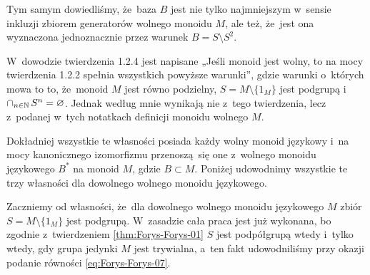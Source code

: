 \documentclass[a4paper,11pt]{article}
\begin{document}
Tym samym dowiedliśmy, że~baza $B$ jest nie tylko najmniejszym w~sensie
inkluzji zbiorem generatorów wolnego monoidu $M$, ale też, że~jest ona
wyznaczona jednoznacznie przez warunek $B = S \setminus S^{ 2 }$.

\vspace{\spaceFour}





\start {} W~dowodzie twierdzenia 1.2.4 jest napisane „Jeśli monoid
jest wolny, to na mocy twierdzenia 1.2.2 spełnia wszystkich powyższe
warunki”, gdzie warunki o~których mowa to to, że~monoid $M$ jest równo
podzielny, $S = M \setminus \{ 1_{ M } \}$ jest podgrupą
i~$\cap_{ n \in \mathbb{N} } \, S^{ n } = \varnothing$. Jednak według mnie wynikają nie z~tego
twierdzenia, lecz z~podanej w~tych notatkach definicji monoidu wolnego $M$.

Dokładniej wszystkie te własności posiada każdy wolny monoid językowy
i~na mocy kanonicznego izomorfizmu przenoszą~się one z~wolnego monoidu
językowego $B^{ * }$ na monoid $M$, gdzie $B \subset M$. Poniżej udowodnimy
wszystkie te trzy własności dla dowolnego wolnego monoidu językowego.

Zaczniemy od własności, że~dla dowolnego wolnego monoidu językowego $M$
zbiór $S = M \setminus \{ 1_{ M } \}$ jest podgrupą. W~zasadzie cała praca jest już
wykonana, bo zgodnie z~twierdzeniem \ref{thm:Forys-Forys-01} $S$ jest
podpółgrupą wtedy i~tylko wtedy, gdy grupa jedynki $M$ jest trywialna,
a~ten fakt udowodniliśmy przy okazji podanie równości
\eqref{eq:Forys-Forys-07}.
\end{document}
